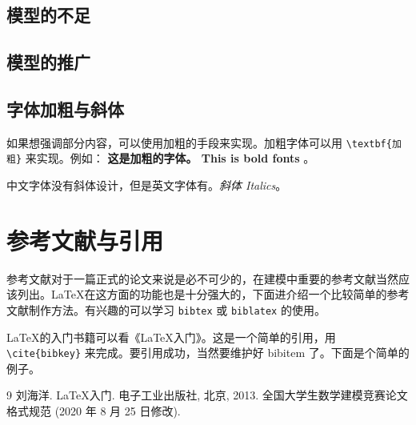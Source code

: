\documentclass[withoutpreface,bwprint]{cumcmthesis} %
\begin{document}
\subsection{模型的不足}
\subsection{模型的推广}

\subsection{字体加粗与斜体}

如果想强调部分内容，可以使用加粗的手段来实现。加粗字体可以用 \verb|\textbf{加粗}| 来实现。例如： \textbf{这是加粗的字体。 This is bold fonts} 。

中文字体没有斜体设计，但是英文字体有。\textit{斜体 Italics}。

\section{参考文献与引用}

参考文献对于一篇正式的论文来说是必不可少的，在建模中重要的参考文献当然应该列出。\LaTeX{}在这方面的功能也是十分强大的，下面进介绍一个比较简单的参考文献制作方法。有兴趣的可以学习 \verb|bibtex| 或 \verb|biblatex| 的使用。

\LaTeX{}的入门书籍可以看《\LaTeX{}入门》\cite{liuhaiyang2013latex}。这是一个简单的引用，用 \verb|\cite{bibkey}| 来完成。要引用成功，当然要维护好 bibitem 了。下面是个简单的例子。



\begin{thebibliography}{9}%
    刘海洋.
    \newblock \LaTeX {}入门\allowbreak[J].
    \newblock 电子工业出版社, 北京, 2013.
    全国大学生数学建模竞赛论文格式规范 (2020 年 8 月 25 日修改).
\end{thebibliography}
\end{document}
